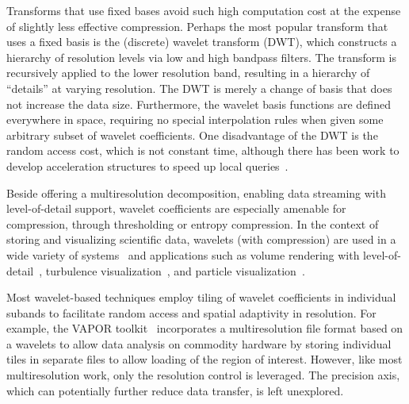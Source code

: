 Transforms that use fixed bases avoid such high computation cost at the expense of slightly less
effective compression. Perhaps the most popular transform that uses a fixed basis is the (discrete)
wavelet transform (DWT), which constructs a hierarchy of resolution levels via low and high bandpass
filters. The transform is recursively applied to the lower resolution band, resulting in a hierarchy
of ``details'' at varying resolution. The DWT is merely a change of basis that does not increase the
data size. Furthermore, the wavelet basis functions are defined everywhere in space, requiring no
special interpolation rules when given some arbitrary subset of wavelet coefficients. One
disadvantage of the DWT is the random access cost, which is not constant time, although there has
been work to develop acceleration structures to speed up local queries~\cite{weiss}.

Beside offering a multiresolution decomposition, enabling data streaming with level-of-detail
support, wavelet coefficients are especially amenable for compression, through thresholding or
entropy compression. In the context of storing and visualizing scientific data, wavelets (with
compression) are used in a wide variety of
systems~\cite{multires_toolkit2003,vapor2007,woodring2011} and applications such as volume rendering
with
level-of-detail~\cite{wavelet-compression-interactive-vis,multires-framework,rapid-compression-volume,interactive-rendering-large-volume,multires-volume-rendering},
turbulence visualization~\cite{treib}, and particle visualization~\cite{sph-octree}.

Most wavelet-based techniques employ tiling of wavelet coefficients in individual subands to
facilitate random access and spatial adaptivity in resolution. For example, the VAPOR
toolkit~\cite{vapor2007} incorporates a multiresolution file format based on a wavelets to allow
data analysis on commodity hardware by storing individual tiles in separate files to allow loading
of the region of interest. However, like most multiresolution work, only the resolution control is
leveraged. The precision axis, which can potentially further reduce data transfer, is left
unexplored.

